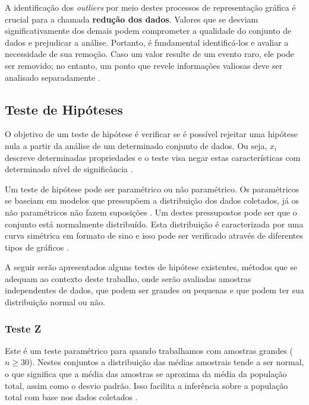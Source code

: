 A identificação dos \textit{outliers} por meio destes processos de representação gráfica é crucial para a chamada \textbf{redução dos dados}. Valores que se desviam significativamente dos demais podem comprometer a qualidade do conjunto de dados e prejudicar a análise. Portanto, é fundamental identificá-los e avaliar a necessidade de sua remoção. Caso um valor resulte de um evento raro, ele pode ser removido; no entanto, um ponto que revele informações valiosas deve ser analisado separadamente \cite{wohlin_experimentation_2012}.

\subsection{Teste de Hipóteses}

O objetivo de um teste de hipótese é verificar se é possível rejeitar uma hipótese nula a partir da análise de um determinado conjunto de dados. Ou seja, \(x_i \) descreve determinadas propriedades e o teste visa negar estas características com determinado nível de significância \cite{wohlin_experimentation_2012}. 

Um teste de hipótese pode ser paramétrico ou não paramétrico. Os paramétricos se baseiam em modelos que pressupõem a distribuição dos dados coletados, já os não paramétricos não fazem suposições \cite{juristo_basics_2001}. Um destes pressupostos pode ser que o conjunto está normalmente distribuído. Esta distribuição é caracterizada por uma curva simétrica em formato de sino e isso pode ser verificado através de diferentes tipos de gráficos \cite{wohlin_experimentation_2012}.

A seguir serão apresentados alguns testes de hipótese existentes, métodos que se adequam ao contexto deste trabalho, onde serão avaliadas amostras independentes de dados, que podem ser grandes ou pequenas e que podem ter sua distribuição normal ou não.

\subsubsection{Teste Z}

Este é um teste paramétrico para quando trabalhamos com amostras grandes (\(n \geq 30\)). Nestes conjuntos a distribuição das médias amostrais tende a ser normal, o que significa que a média das amostras se aproxima da média da população total, assim como o desvio padrão. Isso facilita a inferência sobre a população total com base nos dados coletados \cite{juristo_basics_2001}.

